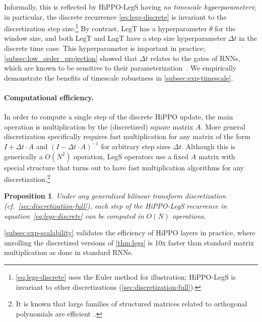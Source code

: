\documentclass{article}
\newtheorem{proposition}[theorem]{Proposition}
\begin{document}
Informally, this is reflected by HiPPO-LegS having \emph{no timescale hyperparameters};
in particular, the discrete recurrence \eqref{eq:legs-discrete} is invariant to the discretization step size.\footnote{\eqref{eq:legs-discrete} uses the Euler method for illustration; HiPPO-LegS is invariant to other discretizations (\cref{sec:discretization-full}).}
By contrast, LegT has a hyperparameter $\theta$ for the window size, and both LegT and LagT have a step size hyperparameter $\Delta t$ in the discrete time case.
This hyperparameter is important in practice; \cref{subsec:low_order_projection} showed that $\Delta t$ relates to the gates of RNNs, which are known to be sensitive to their parameterization~\cite{jozefowicz2015empirical,tallec2018can,gu2020improving}.
We empirically demonstrate the benefits of timescale robustness in \cref{subsec:exp-timescale}.









\paragraph{Computational efficiency.}
In order to compute a single step of the discrete HiPPO update, the main operation is multiplication by the (discretized) square matrix $A$.
More general discretization specifically requires fast multiplication for any matrix of the form $I + \Delta t \cdot A$ and $(I - \Delta t \cdot A)^{-1}$ for arbitrary step sizes $\Delta t$.
Although this is generically a $O(N^2)$ operation, LegS operators use a fixed $A$ matrix with special structure
that turns out to have fast multiplication algorithms for any discretization.\footnote{It is known that large families of structured matrices related to orthogonal polynomials are efficient~\cite{de2018two}.}
\begin{proposition}\label{prop:efficiency}
    Under any generalized bilinear transform discretization (cf.\
    \cref{sec:discretization-full}), each step of the HiPPO-LegS recurrence in equation~\eqref{eq:legs-discrete} can be computed in $O(N)$ operations.
\end{proposition}

\cref{subsec:exp-scalability} validates the efficiency of HiPPO layers in practice, where unrolling the discretized versions of \cref{thm:legs} is 10x faster than standard matrix multiplication as done in standard RNNs.
\end{document}
